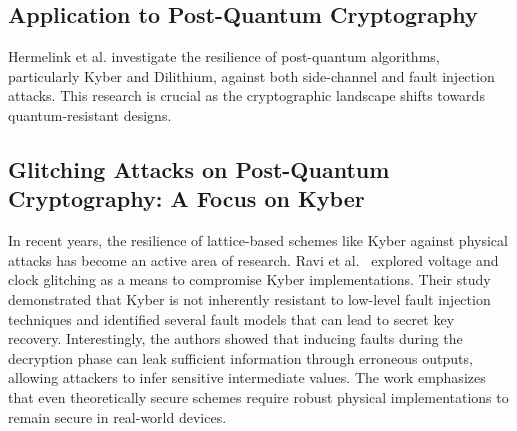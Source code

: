 \subsection*{Application to Post-Quantum Cryptography}
Hermelink et al. \cite{hermelink2023side} investigate the resilience of post-quantum algorithms, particularly Kyber and Dilithium, against both side-channel and fault injection attacks. This research is crucial as the cryptographic landscape shifts towards quantum-resistant designs.


\subsection*{Glitching Attacks on Post-Quantum Cryptography: A Focus on Kyber}

In recent years, the resilience of lattice-based schemes like Kyber against physical attacks has become an active area of research. Ravi et al.~\cite{ravi2021fault} explored voltage and clock glitching as a means to compromise Kyber implementations. Their study demonstrated that Kyber is not inherently resistant to low-level fault injection techniques and identified several fault models that can lead to secret key recovery. Interestingly, the authors showed that inducing faults during the decryption phase can leak sufficient information through erroneous outputs, allowing attackers to infer sensitive intermediate values. The work emphasizes that even theoretically secure schemes require robust physical implementations to remain secure in real-world devices.

